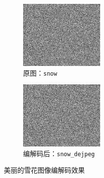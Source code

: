 \documentclass{article}
\numberwithin{figure}{section}
\numberwithin{table}{section}
\numberwithin{listing}{section}
\numberwithin{equation}{section}
\begin{document}
\begin{enumerate}
                \begin{figure}[H]
                    \centering
                    \begin{subfigure}{0.5\textwidth}
                        \centering
                        \includegraphics[width=0.6\linewidth]{snow}
                        \caption{原图：\texttt{snow}}
                    \end{subfigure}%
                    \begin{subfigure}{0.5\textwidth}
                        \centering
                        \includegraphics[width=0.6\linewidth]{snow_dejpeg}
                        \caption{编解码后：\texttt{snow\_dejpeg}}
                    \end{subfigure}
                    \caption{美丽的雪花图像编解码效果}
                \end{figure}

        \end{enumerate}
    

    
\end{document}
